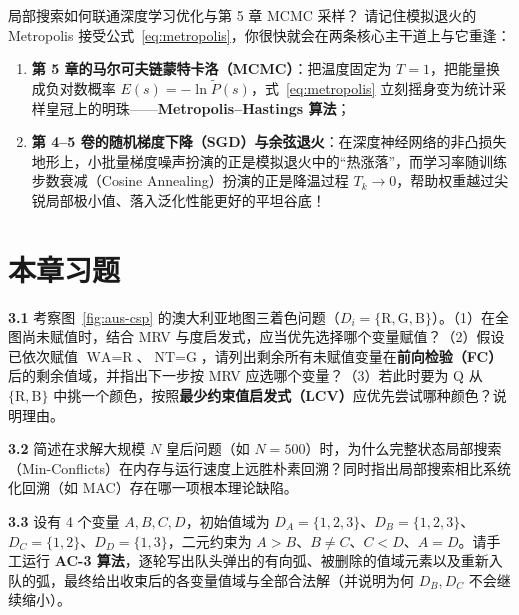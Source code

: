 \begin{insightBox}{局部搜索如何联通深度学习优化与第 5 章 MCMC 采样？}
请记住模拟退火的 Metropolis 接受公式~\eqref{eq:metropolis}，你很快就会在两条核心主干道上与它重逢：
\begin{enumerate}
  \item \textbf{第 5 章的马尔可夫链蒙特卡洛（MCMC）}：把温度固定为 $T=1$，把能量换成负对数概率 $E(s) = -\ln \tilde{P}(s)$，式~\eqref{eq:metropolis} 立刻摇身变为统计采样皇冠上的明珠——\textbf{Metropolis--Hastings 算法}；
  \item \textbf{第 4--5 卷的随机梯度下降（SGD）与余弦退火}：在深度神经网络的非凸损失地形上，小批量梯度噪声扮演的正是模拟退火中的“热涨落”，而学习率随训练步数衰减（Cosine Annealing）扮演的正是降温过程 $T_k \to 0$，帮助权重越过尖锐局部极小值、落入泛化性能更好的平坦谷底！
\end{enumerate}
\end{insightBox}

\section{本章习题}\label{sec:ch3-ex}


\textbf{3.1} \quad 考察图~\ref{fig:aus-csp} 的澳大利亚地图三着色问题（$D_i=\{\text{R},\text{G},\text{B}\}$）。（1）在全图尚未赋值时，结合 MRV 与度启发式，应当优先选择哪个变量赋值？（2）假设已依次赋值 $\text{WA}=\text{R}$、$\text{NT}=\text{G}$，请列出剩余所有未赋值变量在\textbf{前向检验（FC）}后的剩余值域，并指出下一步按 MRV 应选哪个变量？（3）若此时要为 $\text{Q}$ 从 $\{\text{R},\text{B}\}$ 中挑一个颜色，按照\textbf{最少约束值启发式（LCV）}应优先尝试哪种颜色？说明理由。

\textbf{3.2} \quad 简述在求解大规模 $N$ 皇后问题（如 $N=500$）时，为什么完整状态局部搜索（Min-Conflicts）在内存与运行速度上远胜朴素回溯？同时指出局部搜索相比系统化回溯（如 MAC）存在哪一项根本理论缺陷。


\textbf{3.3} \quad 设有 4 个变量 $A, B, C, D$，初始值域为 $D_A=\{1,2,3\}$、$D_B=\{1,2,3\}$、$D_C=\{1,2\}$、$D_D=\{1,3\}$，二元约束为 $A > B$、$B \neq C$、$C < D$、$A = D$。请手工运行 \textbf{AC-3 算法}，逐轮写出队头弹出的有向弧、被删除的值域元素以及重新入队的弧，最终给出收束后的各变量值域与全部合法解（并说明为何 $D_B, D_C$ 不会继续缩小）。


